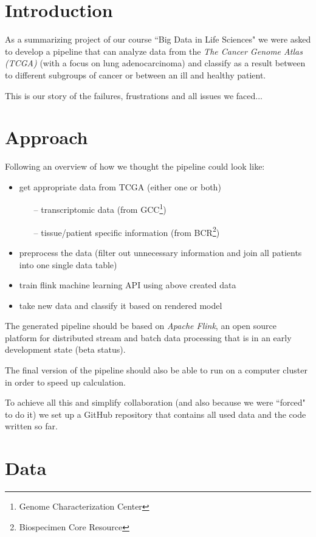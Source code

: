 \documentclass{bioinfo}
\begin{document}
\section{Introduction}

As a summarizing project of our course ``Big Data in Life Sciences" we were asked to develop a pipeline that can analyze data from the \emph{The Cancer Genome Atlas (TCGA)} (with a focus on lung adenocarcinoma) and classify as a result between to different subgroups of cancer or between an ill and healthy patient.

This is our story of the failures, frustrations and all issues we faced... 



\section{Approach}

Following an overview of how we thought the pipeline could look like:
\begin{itemize}
\item get appropriate data from TCGA (either one or both)
\begin{itemize}
\item[--] transcriptomic data (from GCC\footnote{Genome Characterization Center})
\item[--] tissue/patient specific information (from BCR\footnote{Biospecimen Core Resource})
\end{itemize}
\item preprocess the data (filter out unnecessary information and join all patients into one single data table)
\item train flink machine learning API using above created data
\item take new data and classify it based on rendered model
\end{itemize}
The generated pipeline should be based on \emph{Apache Flink}, an open source platform for distributed stream and batch data processing that is in an early development state (beta status).

The final version of the pipeline should also be able to run on a computer cluster in order to speed up calculation.

To achieve all this and simplify collaboration (and also because we were ``forced" to do it) we set up a GitHub repository that contains all used data and the code written so far.


\section{Data}
\end{document}
